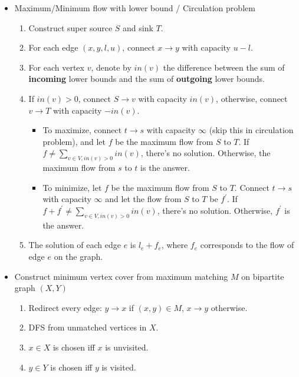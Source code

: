 \begin{itemize}
    \itemsep-0.3em
    \item Maximum/Minimum flow with lower bound / Circulation problem
    \vspace{-1em}
    \begin{enumerate}
        \itemsep-0.3em
        \item Construct super source $S$ and sink $T$.
        \item For each edge $(x, y, l, u)$, connect $x \rightarrow y$ with capacity $u - l$.
        \item For each vertex $v$, denote by $in(v)$ the difference between the sum of \textbf{incoming} lower bounds and the sum of \textbf{outgoing} lower bounds.
        \item If $in(v) > 0$, connect $S \rightarrow v$ with capacity $in(v)$, otherwise, connect $v \rightarrow T$ with capacity $-in(v)$.
        \begin{itemize}
            \itemsep-0.2em
            \item To maximize, connect $t \rightarrow s$ with capacity $\infty$ (skip this in circulation problem), and let $f$ be the maximum flow from $S$ to $T$. If $f \neq \sum_{v \in V, in(v) > 0}{in(v)}$, there's no solution. Otherwise, the maximum flow from $s$ to $t$ is the answer.
            \item To minimize, let $f$ be the maximum flow from $S$ to $T$. Connect $t \rightarrow s$ with capacity $\infty$ and let the flow from $S$ to $T$ be $f^\prime$. If $f + f^\prime \neq \sum_{v \in V, in(v) > 0}{in(v)}$, there's no solution. Otherwise, $f^\prime$ is the answer.
        \end{itemize}
        \item The solution of each edge $e$ is $l_e + f_e$, where $f_e$ corresponds to the flow of edge $e$ on the graph.
    \end{enumerate}
    \item Construct minimum vertex cover from maximum matching $M$ on bipartite graph $(X, Y)$
    \vspace{-1em}
    \begin{enumerate}
        \itemsep-0.3em
        \item Redirect every edge: $y \rightarrow x$ if $(x, y) \in M$, $x \rightarrow y$ otherwise.
        \item DFS from unmatched vertices in $X$.
        \item $x \in X$ is chosen iff $x$ is unvisited.
        \item $y \in Y$ is chosen iff $y$ is visited.

\end{enumerate}
\end{itemize}
